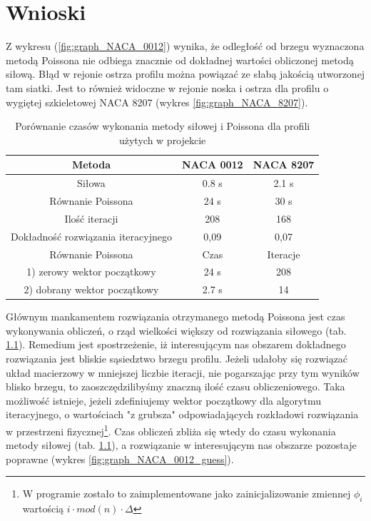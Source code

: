 \chapter{Wnioski}

\indent\indent Z wykresu (\ref{fig:graph_NACA_0012}) wynika, że odległość od brzegu wyznaczona metodą Poissona nie odbiega znacznie od dokładnej wartości obliczonej metodą siłową. Błąd w rejonie ostrza profilu można powiązać ze słabą jakością utworzonej tam siatki. Jest to również widoczne w rejonie noska i ostrza dla profilu o wygiętej szkieletowej \textsf{NACA 8207} (wykres \ref{fig:graph_NACA_8207}).

\begin{table}[h]\footnotesize
  \caption{Porównanie czasów wykonania metody siłowej i Poissona dla profili użytych w projekcie}
  \label{tab:comparision}
  \centering
\begin{tabular}{|c|c|c|}
\hline 
\rowcolor{light-gray} Metoda & NACA 0012 & NACA 8207 \\ 
\hline 
Siłowa  & 0.8 s & 2.1 s \\ 
\hline 
Równanie Poissona & 24 s & 30 s \\ 
\hline 
Ilość iteracji & 208 & 168 \\
\hline
Dokładność rozwiązania iteracyjnego & 0,09 & 0,07 \\
\hline\hline
\rowcolor{light-gray} Równanie Poissona & Czas & Iteracje\\
		\hline
		1) zerowy wektor początkowy & 24 s & 208 \\ 
		\hline
		2) dobrany wektor początkowy & 2.7 s & 14 \\
		\hline
\end{tabular} 
\end{table}

\indent Głównym mankamentem rozwiązania otrzymanego metodą Poissona jest czas wykonywania obliczeń, o rząd wielkości większy od rozwiązania siłowego (tab. \ref{tab:comparision}). Remedium jest spostrzeżenie, iż interesującym nas obszarem dokładnego rozwiązania jest bliskie sąsiedztwo brzegu profilu. Jeżeli udałoby się rozwiązać układ macierzowy w mniejszej liczbie iteracji, nie pogarszając przy tym wyników blisko brzegu, to zaoszczędzilibyśmy znaczną ilość czasu obliczeniowego. Taka możliwość istnieje, jeżeli zdefiniujemy wektor początkowy dla algorytmu iteracyjnego, o wartościach "z grubsza" odpowiadających rozkładowi rozwiązania w przestrzeni fizycznej\footnote{W programie zostało to zaimplementowane jako zainicjalizowanie zmiennej $\phi_i$ wartością \mbox{$i\cdot mod(n)\cdot \Delta$}}. Czas obliczeń  zbliża się wtedy do czasu wykonania metody siłowej (tab. \ref{tab:comparision}), a rozwiązanie w interesującym nas obszarze pozostaje poprawne (wykres \ref{fig:graph_NACA_0012_guess}).

